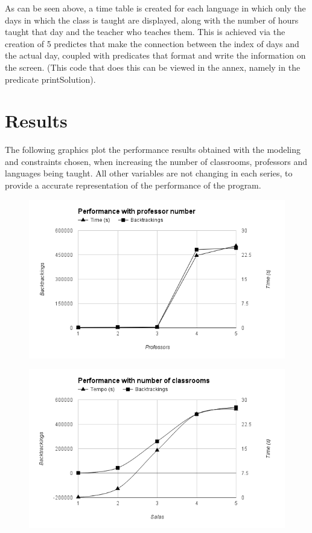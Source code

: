 \documentclass{llncs}
\begin{document}
 As can be seen above, a time table is created for each language in which only the days in which the class is taught are displayed, along with the number of hours taught that day and the teacher who teaches them. This is achieved via the creation of 5 predictes that make the connection between the index of days and the actual day, coupled with predicates that format and write the information on the screen. (This code that does this can be viewed in the annex, namely in the predicate printSolution).
 
 \section{Results}
The following graphics plot the performance results obtained with the modeling and constraints chosen, when increasing the number of classrooms, professors and languages being taught. All other variables are not changing in each series, to provide a accurate representation of the performance of the program.

\begin{figure}[h]
  \centering
    \includegraphics[width=1\textwidth]{professor.png}
\end{figure}


\begin{figure}[h]
  \centering
    \includegraphics[width=1\textwidth]{classrooms.png}
\end{figure}
\end{document}
